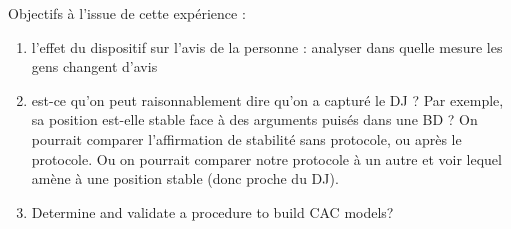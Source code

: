 \documentclass[version=3.21, pagesize, twoside=off, bibliography=totoc, DIV=calc, fontsize=12pt, a4paper]{scrartcl}
\begin{document}
Objectifs à l’issue de cette expérience : 
\begin{enumerate}
	\item l’effet du dispositif sur l’avis de la personne : analyser dans quelle mesure les gens changent d’avis
	\item est-ce qu’on peut raisonnablement dire qu’on a capturé le DJ ? Par exemple, sa position est-elle stable face à des arguments puisés dans une BD ? On pourrait comparer l’affirmation de stabilité sans protocole, ou après le protocole. Ou on pourrait comparer notre protocole à un autre et voir lequel amène à une position stable (donc proche du DJ).
	\item Determine and validate a procedure to build CAC models?
\end{enumerate}
\end{document}
